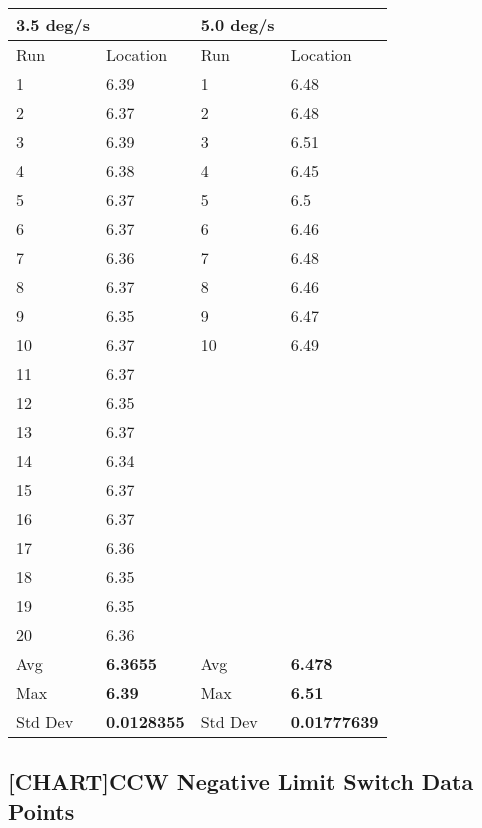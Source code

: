 \documentclass[SE,lsstdraft,authoryear,toc]{lsstdoc}
\begin{document}
\begin{longtable}[]{@{}llll@{}}
\toprule
3.5 deg/s & & 5.0 deg/s & \\
\midrule
\endhead
Run & Location & Run & Location \\
1 & 6.39 & 1 & 6.48 \\
2 & 6.37 & 2 & 6.48 \\
3 & 6.39 & 3 & 6.51 \\
4 & 6.38 & 4 & 6.45 \\
5 & 6.37 & 5 & 6.5 \\
6 & 6.37 & 6 & 6.46 \\
7 & 6.36 & 7 & 6.48 \\
8 & 6.37 & 8 & 6.46 \\
9 & 6.35 & 9 & 6.47 \\
10 & 6.37 & 10 & 6.49 \\
11 & 6.37 & & \\
12 & 6.35 & & \\
13 & 6.37 & & \\
14 & 6.34 & & \\
15 & 6.37 & & \\
16 & 6.37 & & \\
17 & 6.36 & & \\
18 & 6.35 & & \\
19 & 6.35 & & \\
20 & 6.36 & & \\
Avg & \textbf{6.3655} & Avg & \textbf{6.478} \\
Max & \textbf{6.39} & Max & \textbf{6.51} \\
Std Dev & \textbf{0.0128355} & Std Dev & \textbf{0.01777639} \\
\bottomrule
\end{longtable}

\hypertarget{chartccw-negative-limit-switch-data-points}{%
\subsection{\texorpdfstring{{{[}CHART{]}}CCW Negative Limit Switch Data
Points}{{[}CHART{]}CCW Negative Limit Switch Data Points}}\label{chartccw-negative-limit-switch-data-points}}
\end{document}
